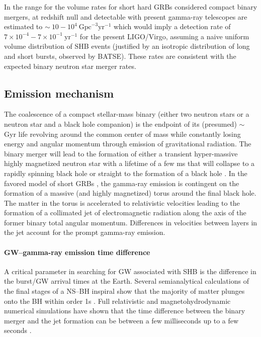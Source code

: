 In \cite{Nakar:2007} the range for the volume rates for short hard GRBs considered compact binary mergers, at redshift null and detectable with present gamma-ray telescopes are estimated to $\sim ~10-10^4 ~\mathrm{Gpc}^{-3}\mathrm{yr}^{-1}$ which would imply a detection rate of $7 \times 10^{-4} - 7 \times 10^{-1} ~\mathrm{yr}^{-1}$ for the present LIGO/Virgo, assuming a naive uniform volume distribution of SHB events (justified by an isotropic distribution of long and short bursts, observed by BATSE). These rates are consistent with the expected binary neutron star merger rates.

\subsection{Emission mechanism}
\label{SHBmodel}

The coalescence of a compact stellar-mass binary (either two neutron stars or a neutron star and a black hole companion) is the endpoint of its (presumed) $\sim$ Gyr life revolving around the common center of mass while constantly losing energy and angular momentum through emission of gravitational radiation. The binary merger will lead to the formation of either a transient hyper-massive highly magnetized neutron star with a lifetime of a few ms \cite{Shibata:2005mz, Duez:2005cj} that will collapse to a rapidly spinning black hole or straight to the formation of a black hole \cite{ShibTan06, Shibata:2007zm}. In the favored model of short GRBs \cite{Shibata:2005mz, Kiuchi:2010ze, Rezzolla:2011da, Oechslin:2005mw}, the gamma-ray emission is contingent on the formation of a massive (and highly magnetized) torus around the final black hole. The matter in the torus is accelerated to relativistic velocities leading to the formation of a collimated jet of electromagnetic radiation along the axis of the former binary total angular momentum. Differences in velocities between layers in the jet account for the prompt gamma-ray emission.

\paragraph{GW--gamma-ray emission time difference}
A critical parameter in searching for GW associated with SHB is the difference in the burst/GW arrival times at the Earth. Several semianalytical calculations of the final stages of a NS--BH inspiral show that the majority of matter plunges onto the BH within order 1s \cite{Davies:2005}. Full relativistic and magnetohydrodynamic numerical simulations have shown that the time difference between the binary merger and the jet formation can be between a few milliseconds up to a few seconds \cite{ShibTan06, Shibata:2007zm, Rezzolla:2011da, Rezzolla:2010fd, Baiotti:2008ra, Oechslin:2005mw}.

